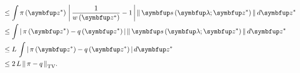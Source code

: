 \begin{proofEnd}
\begin{align}
    &\leq
    \int
    \pi\left(\vz^*\right)\,
    \abs{
     \frac{1}{w\left(\vz^*\right)} - 1
    } \,
    \norm{
      \vs\left(\vlambda;\vz^*\right)
    } \,
    d\vz^*
    \\
    &\leq
    \int
    \abs{
      \pi\left(\vz^*\right) - q\left(\vz^*\right)
    } \,
    \norm{
      \vs\left(\vlambda;\vz^*\right)
    } \,
    d\vz^*
    \\
    &\leq
    L \,
    \int
    \abs{
      \pi\left(\vz^*\right) - q\left(\vz^*\right)
    } \,
    d\vz^*
    \\
    &\leq
    2 \, L \, \DTV{\pi}{q}.\label{eq:imh_bias_left}
  \end{align}


\end{proofEnd}
